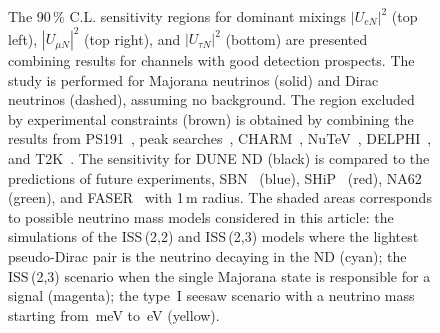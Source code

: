 \begin{figure}
	\centering
	\noindent{}

	\vspace{0.5em}
	\vspace{-0.2em}
	\footnotesize
	\caption{The 90\,\% C.L. sensitivity regions for dominant mixings %
		$|U_{e N}|^2$ (top left), $|U_{\mu N}|^2$ (top right), and $|U_{\tau N}|^2$ (bottom) are presented %
		combining results for channels with good detection prospects.
		The study is performed for Majorana neutrinos (solid) and Dirac neutrinos (dashed), %
		assuming no background.
		The region excluded by experimental constraints (brown) is obtained by combining the results from
		PS191~\cite{Bernardi:1985ny, Bernardi:1987ek}, %
		peak searches~\cite{Artamonov:2014urb, Britton:1992pg, Britton:1992xv, Aguilar-Arevalo:2017vlf, Aguilar-Arevalo:2019owf}, %
		CHARM~\cite{Vilain:1994vg}, NuTeV~\cite{Vaitaitis:1999wq}, DELPHI~\cite{Abreu:1996pa}, and T2K~\cite{Abe:2019kgx}.
		The sensitivity for DUNE ND (black) is compared to the predictions of future experiments, %
		SBN~\cite{Ballett:2016opr} (blue), %
		SHiP~\cite{Alekhin:2015byh} (red), NA62~\cite{Drewes:2018irr} (green), and FASER~\cite{Kling:2018wct} with 1\,m radius.
		The shaded areas corresponds to possible neutrino mass models considered in this article: %
		the simulations of the ISS\,(2,2) and ISS\,(2,3) models where the lightest %
		pseudo-Dirac pair is the neutrino decaying in the ND (cyan); %
		the ISS\,(2,3) scenario when the single Majorana state is responsible for a signal (magenta); %
		the type~I seesaw scenario with a neutrino mass starting from \,meV to \,eV (yellow).}
	\label{fig:sensAll}
\end{figure}


